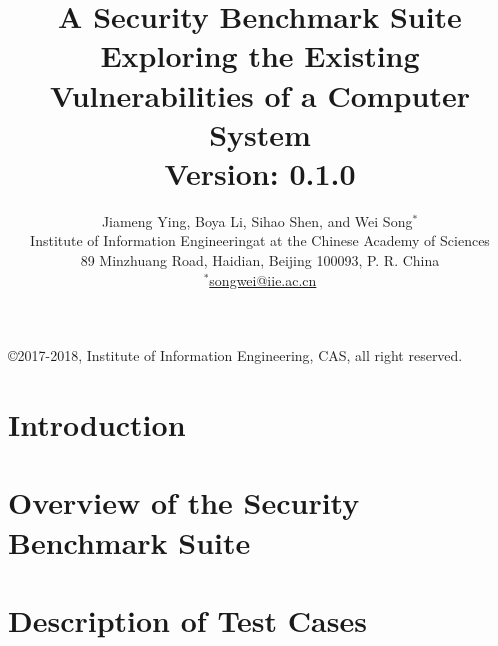 \documentclass[a4paper]{book}
\begin{document}
\title{\textbf{A Security Benchmark Suite Exploring the Existing Vulnerabilities of a Computer System} \\ \large{Version: 0.1.0}}

\author{Jiameng Ying, Boya Li, Sihao Shen, and Wei Song$^*$\\
\small{Institute of Information Engineeringat at the Chinese Academy of Sciences}\\
\small{89 Minzhuang Road, Haidian, Beijing 100093, P. R. China}\\
\small{$^*$\url{songwei@iie.ac.cn}}}

\maketitle

\copyright 2017-2018, Institute of Information Engineering, CAS, all right reserved.

\tableofcontents
\newpage

\chapter{Introduction}

\chapter{Overview of the Security Benchmark Suite}

\chapter{Description of Test Cases}
\end{document}
